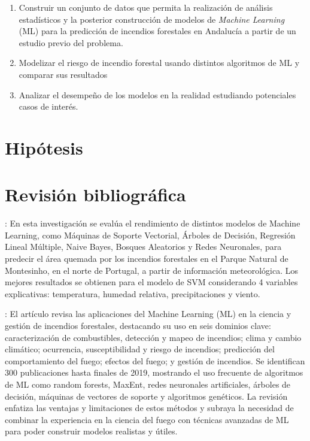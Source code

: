 \documentclass[12pt,a4paper,]{book}
\numberwithin{dummy}{section}
\theoremstyle{ocrenumbox}
\theoremstyle{blacknumex}
\theoremstyle{blacknumbox}
\theoremstyle{ocrenum}
\theoremstyle{ocrenum}
\begin{document}
\begin{enumerate}
\def\labelenumi{\arabic{enumi}.}
\item
  Construir un conjunto de datos que permita la realización de análisis
  estadísticos y la posterior construcción de modelos de \emph{Machine
  Learning} (ML) para la predicción de incendios forestales en Andalucía
  a partir de un estudio previo del problema.
\item
  Modelizar el riesgo de incendio forestal usando distintos algoritmos
  de ML y comparar sus resultados
\item
  Analizar el desempeño de los modelos en la realidad estudiando
  potenciales casos de interés.
\end{enumerate}

\hypertarget{hipuxf3tesis}{%
\section{Hipótesis}\label{hipuxf3tesis}}

\hypertarget{revisiuxf3n-bibliogruxe1fica}{%
\section{Revisión bibliográfica}\label{revisiuxf3n-bibliogruxe1fica}}

\citet{CortezMorais}: En esta investigación se evalúa el rendimiento de
distintos modelos de Machine Learning, como Máquinas de Soporte
Vectorial, Árboles de Decisión, Regresión Lineal Múltiple, Naive Bayes,
Bosques Aleatorios y Redes Neuronales, para predecir el área quemada por
los incendios forestales en el Parque Natural de Montesinho, en el norte
de Portugal, a partir de información meteorológica. Los mejores
resultados se obtienen para el modelo de SVM considerando 4 variables
explicativas: temperatura, humedad relativa, precipitaciones y viento.

\citet{ReviewMLApplicationsWF}: El artículo revisa las aplicaciones del
Machine Learning (ML) en la ciencia y gestión de incendios forestales,
destacando su uso en seis dominios clave: caracterización de
combustibles, detección y mapeo de incendios; clima y cambio climático;
ocurrencia, susceptibilidad y riesgo de incendios; predicción del
comportamiento del fuego; efectos del fuego; y gestión de incendios. Se
identifican 300 publicaciones hasta finales de 2019, mostrando el uso
frecuente de algoritmos de ML como random forests, MaxEnt, redes
neuronales artificiales, árboles de decisión, máquinas de vectores de
soporte y algoritmos genéticos. La revisión enfatiza las ventajas y
limitaciones de estos métodos y subraya la necesidad de combinar la
experiencia en la ciencia del fuego con técnicas avanzadas de ML para
poder construir modelos realistas y útiles.
\end{document}
